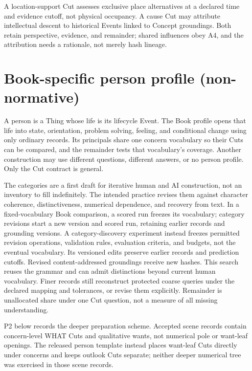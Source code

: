\documentclass[11pt,a4paper]{article}
\begin{document}
A location-support Cut assesses exclusive place alternatives at a declared
time and evidence cutoff, not physical occupancy. A cause Cut may attribute
intellectual descent to historical Events linked to Concept groundings. Both
retain perspective, evidence, and remainder; shared influences obey A4, and
the attribution needs a rationale, not merely hash lineage.

\section{Book-specific person profile (non-normative)}

A person is a Thing whose life is its lifecycle Event. The Book profile opens
that life into state, orientation, problem solving, feeling, and conditional
change using only ordinary records. Its principals share one concern vocabulary
so their Cuts can be compared, and the remainder tests that vocabulary's
coverage. Another construction may use different questions, different answers,
or no person profile. Only the Cut contract is general.

The categories are a first draft for iterative human and AI construction, not
an inventory to fill indefinitely. The intended practice revises them against
character coherence, distinctiveness, numerical dependence, and recovery from
text. In a fixed-vocabulary Book comparison, a scored run freezes its
vocabulary; category revisions start a new version and scored run, retaining
earlier records and grounding versions. A category-discovery experiment instead
freezes permitted revision operations, validation rules, evaluation criteria,
and budgets, not the eventual vocabulary. Its versioned edits preserve earlier
records and prediction cutoffs.
Revised content-addressed groundings receive new hashes. This search reuses
the grammar and can admit distinctions beyond current human vocabulary.
Finer records still reconstruct protected coarse queries under the declared
mapping and tolerances, or revise them explicitly. Remainder is unallocated
share under one Cut question, not a measure of all missing understanding.

P2 below records the deeper preparation scheme. Accepted scene records contain
concern-level WHAT Cuts and qualitative wants, not numerical pole or want-leaf
openings. The released person template instead places want-leaf Cuts directly
under concerns and keeps outlook Cuts separate; neither deeper numerical tree
was exercised in those scene records.
\end{document}
